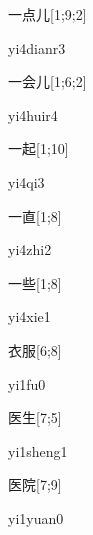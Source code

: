 \begin{verbete}[yi4dianr3]{一点儿}[1;9;2]
\begin{pronuncia}{yi4dianr3}
\end{pronuncia}
\end{verbete}

\begin{verbete}[yi4huir4]{一会儿}[1;6;2]
\begin{pronuncia}{yi4huir4}
\end{pronuncia}
\end{verbete}

\begin{verbete}[yi4qi3]{一起}[1;10]
\begin{pronuncia}{yi4qi3}
\end{pronuncia}
\end{verbete}

\begin{verbete}[yi4zhi2]{一直}[1;8]
\begin{pronuncia}{yi4zhi2}
\end{pronuncia}
\end{verbete}

\begin{verbete}[yi4xie1]{一些}[1;8]
\begin{pronuncia}{yi4xie1}
\end{pronuncia}
\end{verbete}

\begin{verbete}[yi1fu0]{衣服}[6;8]
\begin{pronuncia}{yi1fu0}
\end{pronuncia}
\end{verbete}

\begin{verbete}[yi1sheng1]{医生}[7;5]
\begin{pronuncia}{yi1sheng1}
\end{pronuncia}
\end{verbete}

\begin{verbete}[yi1yuan0]{医院}[7;9]
\begin{pronuncia}{yi1yuan0}
\end{pronuncia}
\end{verbete}


